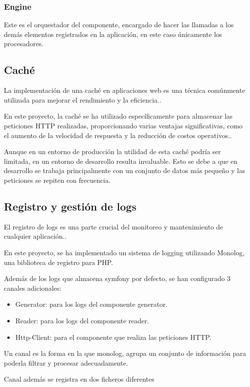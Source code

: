 \subsubsection*{Engine}
Este es el orquestador del componente, encargado de hacer las llamadas a los demás elementos registrados en la
aplicación, en este caso únicamente los procesadores.

\subsection{Caché}
La implementación de una caché en aplicaciones web es una técnica comúnmente utilizada para mejorar el rendimiento y la
eficiencia..

En este proyecto, la caché se ha utilizado específicamente para almacenar las peticiones HTTP realizadas, proporcionando
varias ventajas significativas, como el aumento de la velocidad de respuesta y la reducción de costos operativos..

Aunque en un entorno de producción la utilidad de esta caché podría ser limitada, en un entorno de desarrollo resulta
invaluable. Esto se debe a que en desarrollo se trabaja principalmente con un conjunto de datos más pequeño y las
peticiones se repiten con frecuencia.

\subsection{Registro y gestión de logs}
El registro de logs es una parte crucial del monitoreo y mantenimiento de cualquier aplicación..

En este proyecto, se ha implementado un sistema de logging utilizando Monolog, una biblioteca de registro para PHP.

Además de los logs que almacena symfony por defecto, se han configurado 3 canales adicionales:

\begin{itemize}
    \item Generator: para los logs del componente generator.
    \item Reader: para los logs del componente reader.
    \item Http-Client: para el componente que realiza las peticiones HTTP.
\end{itemize}

Un canal es la forma en la que monolog, agrupa un conjunto de información para poderla filtrar y procesar adecuadamente.

Canal además se registra en dos ficheros diferentes

